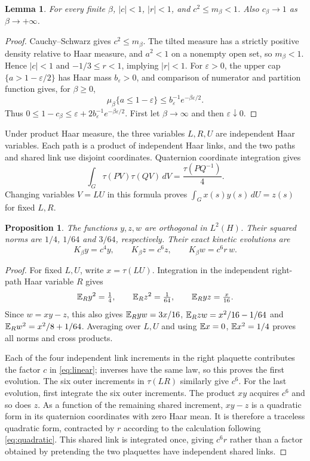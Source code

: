 \documentclass[11pt]{article}
\newtheorem{lemma}[theorem]{Lemma}
\newtheorem{proposition}[theorem]{Proposition}
\begin{document}
\begin{lemma}\label{lem:channelbounds}
For every finite $\beta$,
$|c|<1$, $|r|<1$, and $c^2\leq m_\beta<1$.
Also $c_\beta\to1$ as $\beta\to+\infty$.
\end{lemma}
\begin{proof}
Cauchy--Schwarz gives $c^2\leq m_\beta$. The tilted measure has a
strictly positive density relative to Haar measure, and $a^2<1$ on a
nonempty open set, so $m_\beta<1$. Hence $|c|<1$ and
$-1/3\leq r<1$, implying $|r|<1$.
For $\varepsilon>0$, the upper cap $\{a>1-\varepsilon/2\}$ has
Haar mass $b_\varepsilon>0$, and comparison of numerator and partition
function gives, for $\beta\geq0$,
\[
 \mu_\beta\{a\leq1-\varepsilon\}
 \leq b_\varepsilon^{-1}e^{-\beta\varepsilon/2}.
\]
Thus $0\leq1-c_\beta\leq\varepsilon+
2b_\varepsilon^{-1}e^{-\beta\varepsilon/2}$.
First let $\beta\to\infty$ and then $\varepsilon\downarrow0$.
\end{proof}

Under product Haar measure, the three variables $L,R,U$ are independent
Haar variables. Each path is a product of independent Haar links, and
the two paths and shared link use disjoint coordinates. Quaternion
coordinate integration gives
\begin{equation}\label{eq:pairtrace}
 \int_G\tau(PV)\tau(QV)\,dV=\frac{\tau(PQ^{-1})}{4}.
\end{equation}
Changing variables $V=LU$ in this formula proves
$\int_G x(s)y(s)\,dU=z(s)$ for fixed $L,R$.

\begin{proposition}\label{prop:channels}
The functions $y,z,w$ are orthogonal in $L^2(H)$. Their squared
norms are $1/4$, $1/64$ and $3/64$, respectively. Their exact kinetic
evolutions are
\begin{equation}\label{eq:threeeigen}
 K_\beta y=c^4y,\qquad K_\beta z=c^6z,\qquad
 K_\beta w=c^6r\,w.
\end{equation}
\end{proposition}
\begin{proof}
For fixed $L,U$, write $x=\tau(LU)$. Integration in the independent
right-path Haar variable $R$ gives
\[
 \mathbb E_R y^2=\tfrac14,\qquad \mathbb E_R z^2=\tfrac1{64},\qquad
 \mathbb E_R yz=\tfrac{x}{16}.
\]
Since $w=xy-z$, this also gives
$\mathbb E_R yw=3x/16$, $\mathbb E_R zw=x^2/16-1/64$ and
$\mathbb E_R w^2=x^2/8+1/64$. Averaging over $L,U$ and using
$\mathbb E x=0$, $\mathbb E x^2=1/4$ proves all norms and cross products.

Each of the four independent link increments in the right plaquette
contributes the factor $c$ in \eqref{eq:linear}; inverses have the same
law, so this proves the first evolution. The six outer increments in
$\tau(LR)$ similarly give $c^6$. For the last evolution, first
integrate the six outer increments. The product $xy$ acquires $c^6$
and so does $z$. As a function of the remaining shared increment,
$xy-z$ is a quadratic form in its quaternion coordinates with zero
Haar mean. It is therefore a traceless quadratic form, contracted by
$r$ according to the calculation following \eqref{eq:quadratic}.
This shared link is integrated once, giving $c^6r$ rather than a
factor obtained by pretending the two plaquettes have independent
shared links.
\end{proof}
\end{document}
